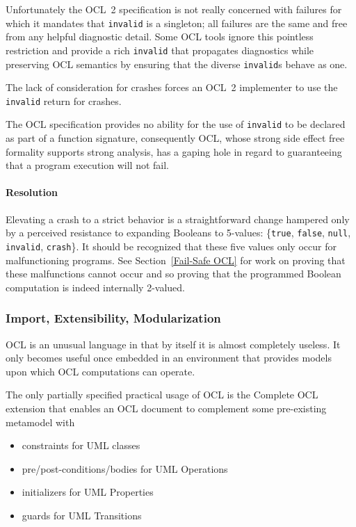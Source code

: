 \documentclass{jot}
\begin{document}
Unfortunately the OCL~2 specification is not really concerned with failures for which it mandates that \verb$invalid$ is a singleton; all failures are the same and free from any helpful diagnostic detail. Some OCL tools ignore this pointless restriction and provide a rich \verb$invalid$ that propagates diagnostics while preserving OCL semantics by ensuring that the diverse \verb$invalid$s behave as one.

The lack of consideration for crashes forces an OCL~2 implementer to use the \verb$invalid$ return for crashes.%

The OCL specification provides no ability for the use of \verb$invalid$ to be declared as part of a function signature, consequently OCL, whose strong side effect free formality supports strong analysis, has a gaping hole in regard to guaranteeing that a program execution will not fail.

\paragraph{Resolution} Elevating a crash to a strict behavior is a straightforward change hampered only by a perceived resistance to expanding Booleans to 5-values: \{\verb$true$, \verb$false$, \verb$null$, \verb$invalid$, \verb$crash$\}. It should be recognized that these five values only occur for malfunctioning programs. See Section~\ref{Fail-Safe OCL} for work on proving that these malfunctions cannot occur and so proving that the programmed Boolean computation is indeed internally 2-valued. 

\subsubsection{Import, Extensibility, Modularization}

OCL is an unusual language in that by itself it is almost completely useless. It only becomes useful once embedded in an environment that provides models upon which OCL computations can operate.

The only partially specified practical usage of OCL is the Complete OCL extension that enables an OCL document to complement some pre-existing metamodel with

\begin{itemize}
	\item constraints for UML classes
	\item pre/post-conditions/bodies for UML Operations
	\item initializers for UML Properties
	\item guards for UML Transitions
\end{itemize}
\end{document}
